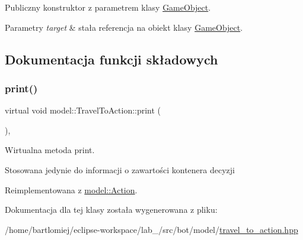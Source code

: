 Publiczny konstruktor z parametrem klasy \hyperlink{classmodel_1_1GameObject}{Game\+Object}. 


\begin{DoxyParams}{Parametry}
{\em target} & stała referencja na obiekt klasy \hyperlink{classmodel_1_1GameObject}{Game\+Object}. \\
\hline
\end{DoxyParams}


\subsection{Dokumentacja funkcji składowych}
\mbox{\label{classmodel_1_1TravelToAction_accc5a7f3bf4d65e22d5d7d86624a8da1}} 
\subsubsection{\texorpdfstring{print()}{print()}}
{\footnotesize\ttfamily virtual void model\+::\+Travel\+To\+Action\+::print (\begin{DoxyParamCaption}{ }\end{DoxyParamCaption})\hspace{0.3cm}{\ttfamily [inline]}, {\ttfamily [virtual]}}



Wirtualna metoda print. 

Stosowana jedynie do informacji o zawartości kontenera decyzji 

Reimplementowana z \hyperlink{classmodel_1_1Action_a2955dbb4a69e38a48aa07d730fe2d77c}{model\+::\+Action}.



Dokumentacja dla tej klasy została wygenerowana z pliku\+:\begin{DoxyCompactItemize}
\item 
/home/bartlomiej/eclipse-\/workspace/lab\+\_/src/bot/model/\hyperlink{travel__to__action_8hpp}{travel\+\_\+to\+\_\+action.\+hpp}\end{DoxyCompactItemize}
